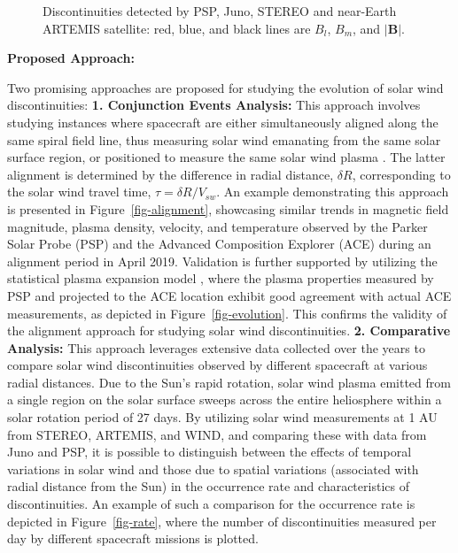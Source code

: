 \documentclass[
  letterpaper,
  DIV=11,
  numbers=noendperiod]{scrartcl}
\begin{document}
\begin{figure}


\caption{\label{fig-examples}Discontinuities detected by PSP, Juno, STEREO and near-Earth ARTEMIS satellite: red, blue, and black lines are \(B_l\), \(B_m\), and \(|{\mathbf B}|\).}

\end{figure}%

\textbf{Proposed Approach:}

Two promising approaches are proposed for studying the evolution of solar wind discontinuities:
\textbf{1. Conjunction Events Analysis:} This approach involves studying instances where spacecraft are either simultaneously aligned along the same spiral field line, thus measuring solar wind emanating from the same solar surface region, or positioned to measure the same solar wind plasma \citep{velliUnderstandingOriginsHeliosphere2020}. The latter alignment is determined by the difference in radial distance, \(\delta R\), corresponding to the solar wind travel time, \(\tau = \delta R / V_{sw}\).
An example demonstrating this approach is presented in Figure~\ref{fig-alignment}, showcasing similar trends in magnetic field magnitude, plasma density, velocity, and temperature observed by the Parker Solar Probe (PSP) and the Advanced Composition Explorer (ACE) during an alignment period in April 2019. Validation is further supported by utilizing the statistical plasma expansion model \citep{perroneRadialEvolutionSolar2019}, where the plasma properties measured by PSP and projected to the ACE location exhibit good agreement with actual ACE measurements, as depicted in Figure~\ref{fig-evolution}. This confirms the validity of the alignment approach for studying solar wind discontinuities.
\textbf{2. Comparative Analysis:} This approach leverages extensive data collected over the years to compare solar wind discontinuities observed by different spacecraft at various radial distances. Due to the Sun's rapid rotation, solar wind plasma emitted from a single region on the solar surface sweeps across the entire heliosphere within a solar rotation period of 27 days. By utilizing solar wind measurements at 1 AU from STEREO, ARTEMIS, and WIND, and comparing these with data from Juno and PSP, it is possible to distinguish between the effects of temporal variations in solar wind and those due to spatial variations (associated with radial distance from the Sun) in the occurrence rate and characteristics of discontinuities. An example of such a comparison for the occurrence rate is depicted in Figure~\ref{fig-rate}, where the number of discontinuities measured per day by different spacecraft missions is plotted.
\end{document}
